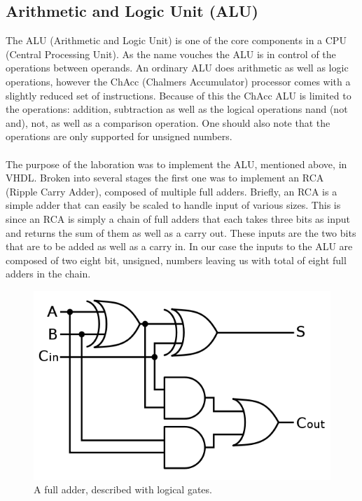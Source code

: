 \documentclass[a4paper,11pt]{article}
\begin{document}
\subsection{Arithmetic and Logic Unit (ALU)}
The ALU (Arithmetic and Logic Unit) is one of the core components in a CPU 
(Central Processing Unit). As the name vouches the ALU is in control of the 
operations between operands. An ordinary ALU does arithmetic as well as logic 
operations, however the ChAcc (Chalmers Accumulator) processor comes with a 
slightly reduced set of instructions. Because of this the ChAcc ALU is limited 
to the operations: addition, subtraction as well as the logical operations nand 
(not and), not, as well as a comparison operation. One should also note that 
the operations are only supported for unsigned numbers.\\\\
\noindent
The purpose of the laboration was to implement the ALU, mentioned above, in 
VHDL. Broken into several stages the first one was to implement an RCA (Ripple 
Carry Adder), composed of multiple full adders. Briefly, an RCA is a simple 
adder that can easily be scaled to handle input of various sizes. This is since 
an RCA is simply a chain of full adders that each takes three bits as input 
and returns the sum of them as well as a carry out. These inputs are the two 
bits that are to be added as well as a carry in. In our case the inputs to the 
ALU are composed of two eight bit, unsigned, numbers leaving us with total 
of eight full adders in the chain.

\begin{figure}[h]
    \centering
    \includegraphics[scale=0.25]{FA.png}
    \caption{A full adder, described with logical gates.}
    \label{FA}
\end{figure}
\end{document}

